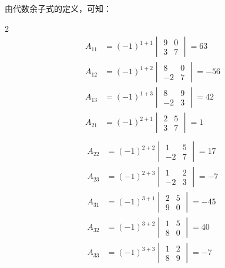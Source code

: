 \begin{solution}
由代数余子式的定义，可知：    
\begin{multicols}{2}
 \[\begin{split}
     A_{11}&=(-1)^{1+1}\begin{vmatrix}
    9&0\\3&7
\end{vmatrix} =63 \\
A_{12}&=(-1)^{1+2}\begin{vmatrix}
    8&0\\-2&7
\end{vmatrix} =-56 \\A_{13}&=(-1)^{1+3}\begin{vmatrix}
    8&9\\-2&3
\end{vmatrix} =42 \\A_{21}&=(-1)^{2+1}\begin{vmatrix}
    2&5\\3&7
\end{vmatrix} =1\\  
 \end{split}   \]
\[\begin{split}
    A_{22}&=(-1)^{2+2}\begin{vmatrix}
        1&5\\-2&7
    \end{vmatrix} =17 \\
    A_{23}&=(-1)^{2+3}\begin{vmatrix}
    1&2\\-2&3
\end{vmatrix} =-7 \\A_{31}&=(-1)^{3+1}\begin{vmatrix}
    2&5\\9&0
\end{vmatrix} =-45 \\A_{32}&=(-1)^{3+2}\begin{vmatrix}
    1&5\\8&0
\end{vmatrix} =40  \\A_{33}&=(-1)^{3+3}\begin{vmatrix}
    1&2\\8&9
\end{vmatrix} =-7  
\end{split}\]
\end{multicols}

\end{solution}

